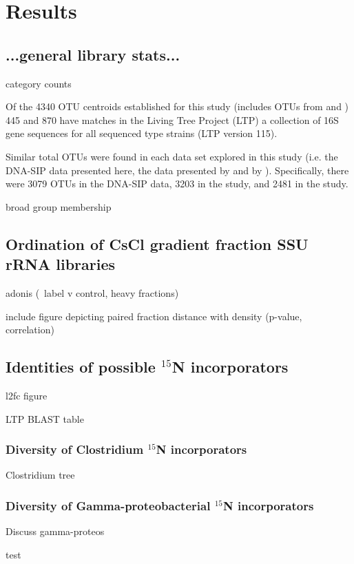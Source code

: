 \section{Results}

\subsection{...general library stats...}

category counts

Of the 4340 OTU centroids established for this study (includes OTUs from \citet{Steven_2013} and \cite{Garcia_Pichel_2013}) 445 and 870 have matches in the Living Tree Project (LTP) a collection of 16S gene sequences for all sequenced type strains \cite{Yarza_2008} (LTP version 115).

Similar total OTUs were found in each data set explored in this study (i.e. the DNA-SIP data presented here, the data presented by  and by \cite{Garcia_Pichel_2013}). Specifically, there were 3079 OTUs in the DNA-SIP data, 3203 in the \citet{Garcia_Pichel_2013} study, and 2481 in the \citet{Steven_2013} study.

broad group membership

\subsection{Ordination of CsCl gradient fraction SSU rRNA libraries}

adonis (~label v control, heavy fractions)

include figure depicting paired fraction distance with density (p-value, correlation)

\subsection{Identities of possible $^{15}$N incorporators}

l2fc figure

LTP BLAST table

\subsubsection{Diversity of Clostridium $^{15}$N incorporators}

Clostridium tree

\subsubsection{Diversity of Gamma-proteobacterial $^{15}$N incorporators}

Discuss gamma-proteos

test



